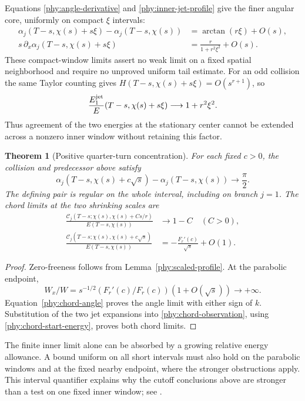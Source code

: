 \documentclass[11pt]{article}
\numberwithin{equation}{section}
\newtheorem{theorem}{Theorem}[section]
\theoremstyle{definition}
\theoremstyle{remark}
\begin{document}
Equations \eqref{phy:angle-derivative} and \eqref{phy:inner-jet-profile}
give the finer angular core, uniformly on compact $\xi$ intervals:
\begin{align}
 \alpha_j(T-s,\chi(s)+s\xi)-\alpha_j(T-s,\chi(s))
 &=\arctan(r\xi)+O(s),\nonumber\\
 s\,\partial_x\alpha_j(T-s,\chi(s)+s\xi)
 &=\frac{r}{1+r^2\xi^2}+O(s).
 \label{phy:inner-cauchy-profile}
\end{align}
These compact-window limits assert no weak limit on a fixed spatial
neighborhood and require no unproved uniform tail estimate.
For an odd collision the same Taylor counting gives
$H(T-s,\chi(s)+s\xi)=O(s^{r+1})$, so
\begin{equation}
 \frac{E_1^{\rm jet}}{E}(T-s,\chi(s)+s\xi)
 \longrightarrow1+r^2\xi^2.
 \label{phy:inner-odd-energy}
\end{equation}
Thus agreement of the two energies at the stationary center cannot be
extended across a nonzero inner window without retaining this factor.

\begin{theorem}[Positive quarter-turn concentration]
\label{phy:quarter-turn}
For each fixed $c>0$, the collision and predecessor above satisfy
\begin{equation}
 \alpha_j(T-s,\chi(s)+c\sqrt{s})
 -\alpha_j(T-s,\chi(s))\longrightarrow\frac\pi2.
 \label{phy:quarter-turn-limit}
\end{equation}
The defining pair is regular on the whole interval, including on branch
$j=1$.  The chord limits at the two shrinking scales are
\begin{align}
 \frac{\mathcal C_j(T-s;\chi(s),\chi(s)+Cs/r)}
 {E(T-s,\chi(s))}&\longrightarrow1-C\quad(C>0),\nonumber\\
 \frac{\mathcal C_j(T-s;\chi(s),\chi(s)+c\sqrt{s})}
 {E(T-s,\chi(s))}&=-\frac{F_r'(c)}{\sqrt{s}}+O(1).
 \label{phy:shrinking-chord-limits}
\end{align}
\end{theorem}
\begin{proof}
Zero-freeness follows from Lemma~\ref{phy:scaled-profile}.
At the parabolic endpoint,
\[
 W_x/W=s^{-1/2}(F_r'(c)/F_r(c))(1+O(\sqrt{s}))\to+\infty.
\]
Equation~\eqref{phy:chord-angle} proves the angle limit with either
sign of $k$.  Substitution of the two jet expansions into
\eqref{phy:chord-observation}, using \eqref{phy:chord-start-energy},
proves both chord limits.
\end{proof}

The finite inner limit alone can be absorbed by a growing relative
energy allowance.  A bound uniform on all short intervals must also
hold on the parabolic windows and at the fixed nearby endpoint, where
the stronger obstructions apply.  This interval quantifier explains
why the cutoff conclusions above are stronger than a test on one
fixed inner window; see \cite{ThetaChord}.
\end{document}
